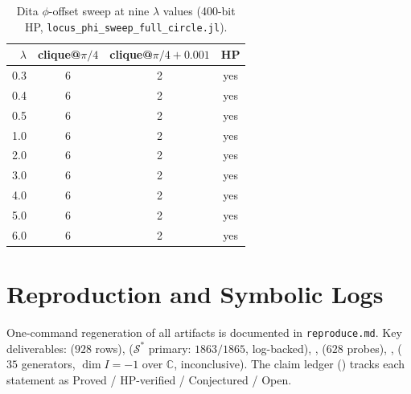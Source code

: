 \documentclass[onecolumn]{IEEEtran}
\begin{document}
\begin{table}[ht]
\caption{Dita $\phi$-offset sweep at nine $\lambda$ values (400-bit HP, \texttt{locus\_phi\_sweep\_full\_circle.jl}).}
\label{tab:phisweep}
\centering
\small
\begin{tabular}{@{}rccc@{}}
\toprule
$\lambda$ & clique@$\pi/4$ & clique@$\pi/4{+}0.001$ & HP \\
\midrule
0.3 & 6 & 2 & yes \\
0.4 & 6 & 2 & yes \\
0.5 & 6 & 2 & yes \\
1.0 & 6 & 2 & yes \\
2.0 & 6 & 2 & yes \\
3.0 & 6 & 2 & yes \\
4.0 & 6 & 2 & yes \\
5.0 & 6 & 2 & yes \\
6.0 & 6 & 2 & yes \\
\bottomrule
\end{tabular}
\end{table}

\section{Reproduction and Symbolic Logs}
\label{app:reproduce}
One-command regeneration of all artifacts is documented in \texttt{reproduce.md}.
Key deliverables:  ($928$ rows),  ($\mathcal{S}^*$ primary: $1863/1865$, log-backed), ,  ($628$ probes), ,  ($35$ generators, $\dim I=-1$ over $\mathbb{C}$, inconclusive).
The claim ledger () tracks each statement as Proved / HP-verified / Conjectured / Open.
\end{document}
